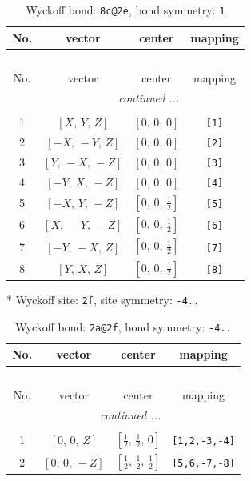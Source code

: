 \documentclass[fleqn,8pt]{jsarticle}
\begin{document}
\begin{longtable}{cccc}
\caption{Wyckoff bond: {\tt 8c@2e}, bond symmetry: {\tt 1}}
 \\
 \hline \hline
No. & vector & center & mapping \\ \hline \endfirsthead

\multicolumn{3}{l}{\tablename\ \thetable{}} \\
 \hline \hline
No. & vector & center & mapping \\ \hline \endhead

 \hline \hline
\multicolumn{3}{r}{\footnotesize\it continued ...} \\ \endfoot

 \hline \hline
\multicolumn{3}{r}{} \\ \endlastfoot

1 & $\left[ X,\, Y,\, Z \right]$ & $\left[ 0,\, 0,\, 0 \right]$ & {\tt [1]} \\ \hline
2 & $\left[ - X,\, - Y,\, Z \right]$ & $\left[ 0,\, 0,\, 0 \right]$ & {\tt [2]} \\ \hline
3 & $\left[ Y,\, - X,\, - Z \right]$ & $\left[ 0,\, 0,\, 0 \right]$ & {\tt [3]} \\ \hline
4 & $\left[ - Y,\, X,\, - Z \right]$ & $\left[ 0,\, 0,\, 0 \right]$ & {\tt [4]} \\ \hline
5 & $\left[ - X,\, Y,\, - Z \right]$ & $\left[ 0,\, 0,\, \frac{1}{2} \right]$ & {\tt [5]} \\ \hline
6 & $\left[ X,\, - Y,\, - Z \right]$ & $\left[ 0,\, 0,\, \frac{1}{2} \right]$ & {\tt [6]} \\ \hline
7 & $\left[ - Y,\, - X,\, Z \right]$ & $\left[ 0,\, 0,\, \frac{1}{2} \right]$ & {\tt [7]} \\ \hline
8 & $\left[ Y,\, X,\, Z \right]$ & $\left[ 0,\, 0,\, \frac{1}{2} \right]$ & {\tt [8]} \\
\end{longtable}
* Wyckoff site: {\tt 2f}, site symmetry: {\tt -4..}
\renewcommand{\arraystretch}{1.2}
\begin{longtable}{cccc}
\caption{Wyckoff bond: {\tt 2a@2f}, bond symmetry: {\tt -4..}}
 \\
 \hline \hline
No. & vector & center & mapping \\ \hline \endfirsthead

\multicolumn{3}{l}{\tablename\ \thetable{}} \\
 \hline \hline
No. & vector & center & mapping \\ \hline \endhead

 \hline \hline
\multicolumn{3}{r}{\footnotesize\it continued ...} \\ \endfoot

 \hline \hline
\multicolumn{3}{r}{} \\ \endlastfoot

1 & $\left[ 0,\, 0,\, Z \right]$ & $\left[ \frac{1}{2},\, \frac{1}{2},\, 0 \right]$ & {\tt [1,2,-3,-4]} \\ \hline
2 & $\left[ 0,\, 0,\, - Z \right]$ & $\left[ \frac{1}{2},\, \frac{1}{2},\, \frac{1}{2} \right]$ & {\tt [5,6,-7,-8]} \\
\end{longtable}
\end{document}

